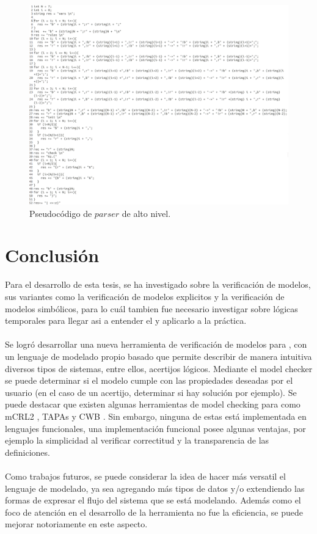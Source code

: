 \begin{figure}[H]
  \centering
  \includegraphics[width=1.1\textwidth]{Figures/parser1.png}
  \caption{Pseudocódigo de $parser$ de alto nivel.}
  \label{fig:parser}
\end{figure}

\chapter*{Conclusión}

Para el desarrollo de esta tesis, se ha investigado sobre la verificación de modelos, sus variantes como la verificación de modelos explicitos y la verificación de modelos simbólicos, para lo cuál tambien fue necesario investigar sobre lógicas temporales para llegar asi a entender el {\mucalculo} y aplicarlo a la práctica.\\
\\
Se logró desarrollar una nueva herramienta de verificación de modelos para {\mucalculo}, con un lenguaje de modelado propio basado que permite describir de manera intuitiva diversos tipos de sistemas, entre ellos, acertijos lógicos. Mediante el model checker se puede determinar si el modelo cumple con las propiedades deseadas por el usuario (en el caso de un acertijo, determinar si hay solución por ejemplo). Se puede destacar que existen algunas herramientas de model checking para {\mucalculo} como mCRL2 \cite{Groote:14}, TAPAs \cite{Calzolai:15} y CWB \cite{Moller:13}. Sin embargo, ninguna de estas está implementada en lenguajes funcionales, una implementación funcional posee algunas ventajas, por ejemplo la simplicidad al verificar correctitud y la transparencia de las definiciones.\\
\\
Como trabajos futuros, se puede considerar la idea de hacer más versatil el lenguaje de modelado, ya sea agregando más tipos de datos y/o extendiendo las formas de expresar el flujo del sistema que se está modelando. Además como el foco de atención en el desarrollo de la herramienta no fue la eficiencia, se puede mejorar notoriamente en este aspecto.
